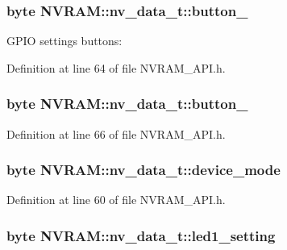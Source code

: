 \hypertarget{struct_n_v_r_a_m_1_1nv__data__t_a36067ff177e63f1cdeedbd7cd53db951}{
\subsubsection[{button\-\_\-1}]{\setlength{\rightskip}{0pt plus 5cm}byte N\-V\-R\-A\-M\-::nv\-\_\-data\-\_\-t\-::button\-\_}}\label{struct_n_v_r_a_m_1_1nv__data__t_a36067ff177e63f1cdeedbd7cd53db951}
G\-P\-I\-O settings buttons\-: 

Definition at line 64 of file N\-V\-R\-A\-M\-\_\-\-A\-P\-I.\-h.

\hypertarget{struct_n_v_r_a_m_1_1nv__data__t_aa89f78239f7821922fbc829a5ead74c7}{
\subsubsection[{button\-\_\-2}]{\setlength{\rightskip}{0pt plus 5cm}byte N\-V\-R\-A\-M\-::nv\-\_\-data\-\_\-t\-::button\-\_}}\label{struct_n_v_r_a_m_1_1nv__data__t_aa89f78239f7821922fbc829a5ead74c7}


Definition at line 66 of file N\-V\-R\-A\-M\-\_\-\-A\-P\-I.\-h.

\hypertarget{struct_n_v_r_a_m_1_1nv__data__t_a33d231ebf8896a89fd566d162aaa6913}{
\subsubsection[{device\-\_\-mode}]{\setlength{\rightskip}{0pt plus 5cm}byte N\-V\-R\-A\-M\-::nv\-\_\-data\-\_\-t\-::device\-\_\-mode}}\label{struct_n_v_r_a_m_1_1nv__data__t_a33d231ebf8896a89fd566d162aaa6913}


Definition at line 60 of file N\-V\-R\-A\-M\-\_\-\-A\-P\-I.\-h.

\hypertarget{struct_n_v_r_a_m_1_1nv__data__t_a76597a384133a0af3bae21b5caa4f7df}{
\subsubsection[{led1\-\_\-setting}]{\setlength{\rightskip}{0pt plus 5cm}byte N\-V\-R\-A\-M\-::nv\-\_\-data\-\_\-t\-::led1\-\_\-setting}}\label{struct_n_v_r_a_m_1_1nv__data__t_a76597a384133a0af3bae21b5caa4f7df}


